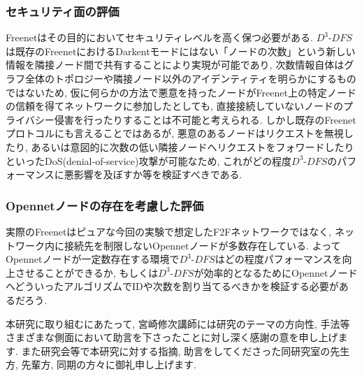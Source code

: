 \documentclass[dvipdfmx]{ampbt}
\begin{document}
\subsubsection*{セキュリティ面の評価}
Freenetはその目的においてセキュリティレベルを高く保つ必要がある. $D^3$-$DFS$は既存のFreenetにおけるDarkentモードにはない「ノードの次数」という新しい情報を隣接ノード間で共有することにより実現が可能であり, 次数情報自体はグラフ全体のトポロジーや隣接ノード以外のアイデンティティを明らかにするものではないため, 仮に何らかの方法で悪意を持ったノードがFreenet上の特定ノードの信頼を得てネットワークに参加したとしても, 直接接続していないノードのプライバシー侵害を行ったりすることは不可能と考えられる. しかし既存のFreenetプロトコルにも言えることではあるが, 悪意のあるノードはリクエストを無視したり, あるいは意図的に次数の低い隣接ノードへリクエストをフォワードしたりといったDoS(denial-of-service)攻撃が可能なため, これがどの程度$D^3$-$DFS$のパフォーマンスに悪影響を及ぼすか等を検証すべきである.

\subsubsection*{Opennetノードの存在を考慮した評価}
実際のFreenetはピュアな今回の実験で想定したF2Fネットワークではなく, ネットワーク内に接続先を制限しないOpennetノードが多数存在している. よってOpennetノードが一定数存在する環境で$D^3$-$DFS$はどの程度パフォーマンスを向上させることができるか, もしくは$D^3$-$DFS$が効率的となるためにOpennetノードへどういったアルゴリズムでIDや次数を割り当てるべきかを検証する必要があるだろう. 

\acknowledgment
本研究に取り組むにあたって, 宮崎修次講師には研究のテーマの方向性, 手法等さまざまな側面において助言を下さったことに対し深く感謝の意を申し上げます. また研究会等で本研究に対する指摘, 助言をしてくださった同研究室の先生方, 先輩方, 同期の方々に御礼申し上げます.





\clearpage
\appendix
\end{document}
